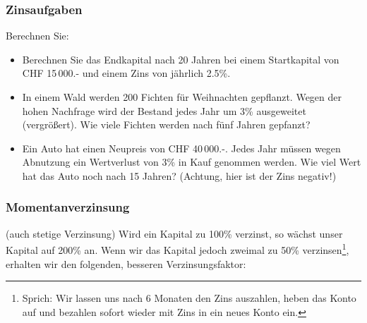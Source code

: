\newpage

\subsubsection{Zinsaufgaben}

Berechnen Sie:

\begin{itemize}
  \item Berechnen Sie das Endkapital nach 20 Jahren bei einem
  Startkapital von CHF 15\,000.- und einem Zins von jährlich
  2.5\%.\\%

\item In einem Wald werden 200 Fichten für Weihnachten
  gepflanzt. Wegen der hohen Nachfrage wird der Bestand jedes Jahr um
  3\% ausgeweitet (vergrößert).
  Wie viele Fichten werden nach fünf Jahren gepfanzt?


\item Ein Auto hat einen Neupreis von CHF 40\,000.-. Jedes Jahr müssen wegen Abnutzung ein Wertverlust von 3\% in Kauf
  genommen werden. Wie viel Wert hat das Auto noch nach 15 Jahren? (Achtung, hier ist der Zins negativ!)

\end{itemize}


\newpage


\subsubsection{Momentanverzinsung}
(auch stetige Verzinsung)
Wird ein Kapital zu 100\% verzinst, so wächst unser Kapital auf 200\%
an. Wenn wir das Kapital jedoch zweimal zu 50\%
verzinsen\footnote{Sprich: Wir lassen uns nach 6 Monaten den Zins
auszahlen, heben das Konto auf und bezahlen sofort wieder mit Zins in
ein neues Konto ein.}, erhalten wir den folgenden, besseren Verzinsungsfaktor:

